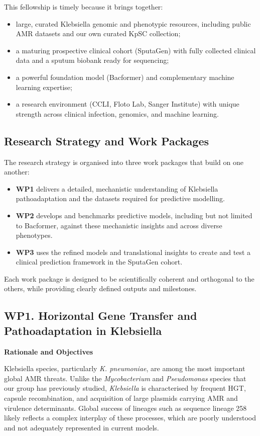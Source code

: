 This fellowship is timely because it brings together:

\begin{itemize}
  \item large, curated Klebsiella genomic and phenotypic resources, including public AMR datasets and our own curated KpSC collection;
  \item a maturing prospective clinical cohort (SputaGen) with fully collected clinical data and a sputum biobank ready for sequencing;
  \item a powerful foundation model (Bacformer) and complementary machine learning expertise;
  \item a research environment (CCLI, Floto Lab, Sanger Institute) with unique strength across clinical infection, genomics, and machine learning.
\end{itemize}

\subsection*{Research Strategy and Work Packages}

The research strategy is organised into three work packages that build on one another:

\begin{itemize}
  \item \textbf{WP1} delivers a detailed, mechanistic understanding of Klebsiella pathoadaptation and the datasets required for predictive modelling.
  \item \textbf{WP2} develops and benchmarks predictive models, including but not limited to Bacformer, against these mechanistic insights and across diverse phenotypes.
  \item \textbf{WP3} uses the refined models and translational insights to create and test a clinical prediction framework in the SputaGen cohort.
\end{itemize}

Each work package is designed to be scientifically coherent and orthogonal to the others, while providing clearly defined outputs and milestones.

\subsection*{WP1. Horizontal Gene Transfer and Pathoadaptation in Klebsiella}

\textbf{Rationale and Objectives}

Klebsiella species, particularly \textit{K. pneumoniae}, are among the most important global AMR threats. Unlike the \textit{Mycobacterium} and \textit{Pseudomonas} species that our group has previously studied, \textit{Klebsiella} is characterised by frequent HGT, capsule recombination, and acquisition of large plasmids carrying AMR and virulence determinants. Global success of lineages such as sequence lineage 258 likely reflects a complex interplay of these processes, which are poorly understood and not adequately represented in current models.

